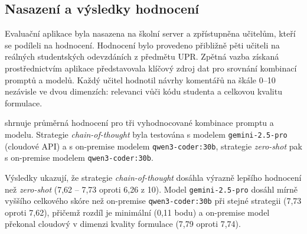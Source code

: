 \subsection{Nasazení a výsledky hodnocení}
\label{subsec:implementation-tool-results}

Evaluační aplikace byla nasazena na školní server a zpřístupněna učitelům, kteří se podíleli na hodnocení.
Hodnocení bylo provedeno přibližně pěti učiteli na reálných studentských odevzdáních z předmětu UPR\@.
Zpětná vazba získaná prostřednictvím aplikace představovala klíčový zdroj dat pro srovnání kombinací promptů a modelů.
Každý učitel hodnotil návrhy komentářů na škále 0--10 nezávisle ve dvou dimenzích: relevanci vůči kódu studenta a celkovou kvalitu formulace.

 shrnuje průměrná hodnocení pro tři vyhodnocované kombinace promptu a modelu.
Strategie \textit{chain-of-thought} byla testována s modelem \texttt{gemini-2.5-pro} (cloudové API) a s on-premise modelem \texttt{qwen3-coder:30b}, strategie \textit{zero-shot} pak s on-premise modelem \texttt{qwen3-coder:30b}.

\begin{table}[H]
    \centering
    \caption{Průměrná hodnocení učitelů dle strategie promptování a modelu. Celkové hodnocení je aritmetickým průměrem relevance a kvality.}
    \label{tab:teacher-ratings}
\end{table}

Výsledky ukazují, že strategie \textit{chain-of-thought} dosáhla výrazně lepšího hodnocení než \textit{zero-shot} (7,62 -- 7,73 oproti 6,26 z 10).
Model \texttt{gemini-2.5-pro} dosáhl mírně vyššího celkového skóre než on-premise \texttt{qwen3-coder:30b} při stejné strategii (7,73 oproti 7,62), přičemž rozdíl je minimální (0,11 bodu) a on-premise model překonal cloudový v dimenzi kvality formulace (7,79 oproti 7,74).

